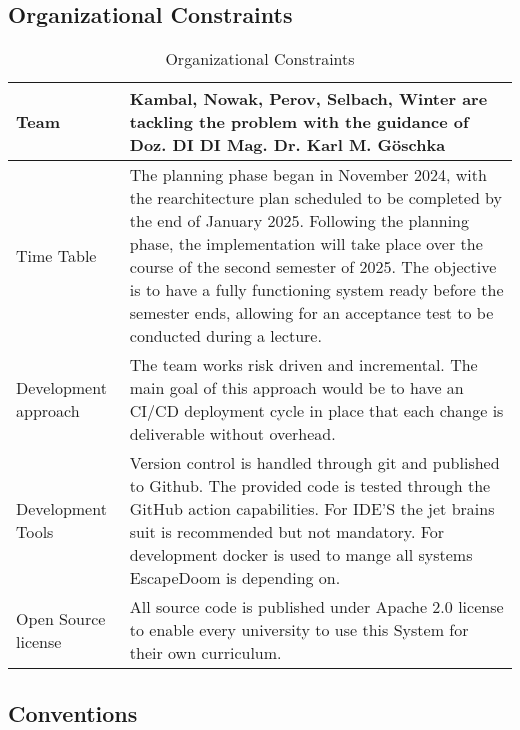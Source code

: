 \subsection{Organizational Constraints}
\label{subsection:organizational-constraints}
\begin{table}[h!tbp]
    \centering
    \begin{tabularx}{1\textwidth} {
        | >{\raggedright\arraybackslash}X
        | >{\raggedleft\arraybackslash}X | }
        \hline
         Team & Kambal, Nowak, Perov, Selbach, Winter are tackling the problem with the guidance of Doz. DI DI Mag. Dr. Karl M. Göschka \\
        \hline
         Time Table & The planning phase began in November 2024, with the rearchitecture plan scheduled to be completed by the end of January 2025. Following the planning phase, the implementation will take place over the course of the second semester of 2025. The objective is to have a fully functioning system ready before the semester ends, allowing for an acceptance test to be conducted during a lecture. \\
         \hline
         Development approach & The team works risk driven and incremental. The main goal of this approach would be to have an CI/CD deployment cycle in place that each change is deliverable without overhead. \\
         \hline
         Development Tools & Version control is handled through git and published to Github. The provided code is tested through the GitHub action capabilities. For IDE'S the jet brains suit is recommended but not mandatory. For development docker is used to mange all systems EscapeDoom is depending on. \\
         \hline 
         Open Source license & All source code is published under Apache 2.0 license to enable every university to use this System for their own curriculum. \\
         \hline
    \end{tabularx}
    \caption{Organizational Constraints}
    \label{tab:organizational-constraints}
\end{table}

\newpage

\subsection{Conventions}
\label{subsection:conventions}

